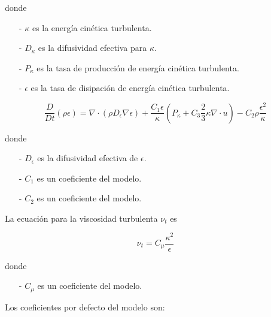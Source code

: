
donde

\begin{itemize}
  \item[-] $\kappa$ es la energía cinética turbulenta.
  \item[-] $D_{\kappa}$ es la difusividad efectiva para $\kappa$.
  \item[-] $P_{\kappa}$ es la tasa de producción de energía cinética turbulenta.
  \item[-] $\epsilon$ es la tasa de disipación de energía cinética turbulenta.
\end{itemize}


\begin{equation}\label{eq:k}
  \frac{D}{Dt}(\rho \epsilon) =
  \nabla \cdot (\rho D_{\epsilon}\nabla \epsilon) +
  \frac{C_{1}\epsilon}{\kappa} \left( P_{\kappa}+C_{3}\frac{2}{3}\kappa\nabla\cdot u \right) -
  C_{2}\rho\frac{\epsilon^{2}}{\kappa}
\end{equation}

donde
\begin{itemize}
  \item[-] $D_{\epsilon}$ es la difusividad efectiva de $\epsilon$.
  \item[-] $C_{1}$ es un coeficiente del modelo.
  \item[-] $C_{2}$ es un coeficiente del modelo.
\end{itemize}

La ecuación para la viscosidad turbulenta $\nu_{t}$ es

\begin{equation}\label{eq:nu_t}
  \nu_{t} = C_{\mu}\frac{\kappa^{2}}{\epsilon}
\end{equation}


donde
\begin{itemize}
        \item[-] $C_{\mu}$ es un coeficiente del modelo.
\end{itemize}

Los coeficientes por defecto del modelo son:

